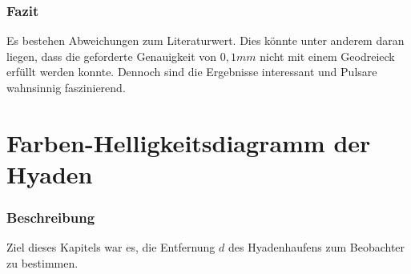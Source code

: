 \documentclass[12pt]{article}
\begin{document}
\subsubsection*{Fazit}
Es bestehen Abweichungen zum Literaturwert. Dies könnte unter anderem daran liegen, dass die geforderte Genauigkeit von $0,1mm$ nicht mit einem Geodreieck erfüllt werden konnte. Dennoch sind die Ergebnisse interessant und Pulsare wahnsinnig faszinierend.
\section{Farben-Helligkeitsdiagramm der Hyaden}
\subsubsection*{Beschreibung}
Ziel dieses Kapitels war es, die Entfernung $d$ des Hyadenhaufens zum Beobachter zu bestimmen.
\end{document}
